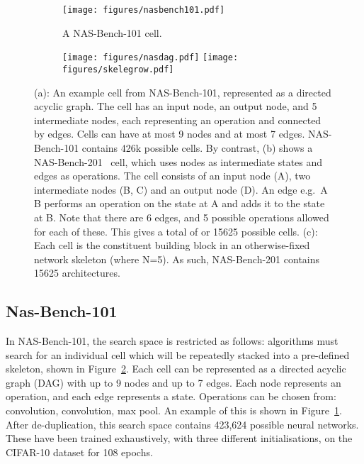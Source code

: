 \documentclass{article}
\begin{document}
\begin{figure*}[!h]
        \begin{subfigure}[b]{0.5\textwidth}
                \texttt{[image: figures/nasbench101.pdf]}
                \centering
                \caption{A NAS-Bench-101 cell.}
                \label{fig:nasdag101}
        \end{subfigure}\begin{subfigure}[b]{0.5\textwidth}
                \texttt{[image: figures/nasdag.pdf]}
                \label{fig:nasdag201}
                \texttt{[image: figures/skelegrow.pdf]}
                \label{fig:skelegrow}
        \end{subfigure}

\caption{(a): An example cell from NAS-Bench-101, represented as a directed acyclic graph. The cell has an input node, an output node, and 5 intermediate nodes, each representing an operation and connected by edges. Cells can have at most 9 nodes and at most 7 edges. NAS-Bench-101 contains 426k possible cells. By contrast, (b) shows a NAS-Bench-201~\citep{Dong2020NAS-Bench-201} cell, which uses nodes as intermediate states and edges as operations. The cell consists of an input node (A), two intermediate nodes (B, C) and an output node (D). An edge e.g.\ A B performs an operation on the state at A and adds it to the state at B. Note that there are 6 edges, and 5 possible operations allowed for each of these. This gives a total of  or 15625 possible cells. (c): Each cell is the constituent building block in an otherwise-fixed network skeleton (where N=5). As such, NAS-Bench-201 contains 15625 architectures.}
\label{fig:test}
\end{figure*}


\subsection{Nas-Bench-101}
In NAS-Bench-101, the search space is restricted as follows: algorithms must search for an individual cell which will be repeatedly stacked into a pre-defined skeleton, shown in Figure~\ref{fig:skelegrow}. Each cell can be represented as a directed acyclic graph (DAG) with up to 9 nodes and up to 7 edges. Each node represents an operation, and each edge represents a state. Operations can be chosen from:  convolution,  convolution,  max pool. An example of this is shown in Figure~\ref{fig:nasdag101}. After de-duplication, this search space contains 423,624 possible neural networks. These have been trained exhaustively, with three different initialisations, on the CIFAR-10 dataset for 108 epochs. 
\end{document}
